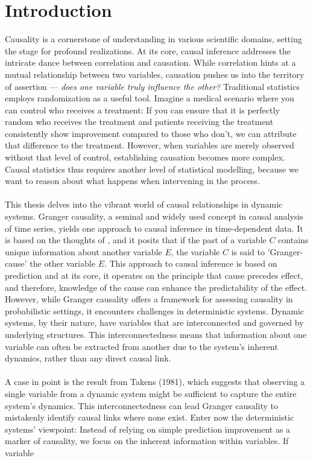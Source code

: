 \documentclass[11pt, a4paper]{memoir}
\theoremstyle{plain}
\theoremstyle{definition}
\begin{document}
\section{Introduction}
Causality is a cornerstone of understanding in various scientific domains, setting the stage for profound realizations. At its core, causal inference addresses the intricate dance between correlation and causation. While correlation hints at a mutual relationship between two variables, causation pushes us into the territory of assertion — \textit{does one variable truly influence the other?} Traditional statistics employs randomization as a useful tool. Imagine a medical scenario where you can control who receives a treatment: If you can ensure that it is perfectly random who receives the treatment and patients receiving the treatment consistently show improvement compared to those who don't, we can attribute that difference to the treatment. However, when variables are merely observed without that level of control, establishing causation becomes more complex. Causal statistics thus requires another level of statistical modelling, because we want to reason about what happens when intervening in the process.\\\\
This thesis delves into the vibrant world of causal relationships in dynamic systems. Granger causality, a seminal and widely used concept in causal analysis of time series, yields one approach to causal inference in time-dependent data. It is based on the thoughts of \cite{Granger}, and it posits that if the past of a variable $C$ contains unique information about another variable $E$, the variable $C$ is said to 'Granger-cause' the other variable $E$. This approach to causal inference is based on prediction and at its core, it operates on the principle that cause precedes effect, and therefore, knowledge of the cause can enhance the predictability of the effect. However, while Granger causality offers a framework for assessing causality in probabilistic settings, it encounters challenges in deterministic systems. Dynamic systems, by their nature, have variables that are interconnected and governed by underlying structures. This interconnectedness means that information about one variable can often be extracted from another due to the system's inherent dynamics, rather than any direct causal link.\\\\
A case in point is the result from Takens (1981), which suggests that observing a single variable from a dynamic system might be sufficient to capture the entire system's dynamics. This interconnectedness can lead Granger causality to mistakenly identify causal links where none exist. Enter now the deterministic systems' viewpoint: Instead of relying on simple prediction improvement as a marker of causality, we focus on the inherent information within variables. If variable 
\end{document}
